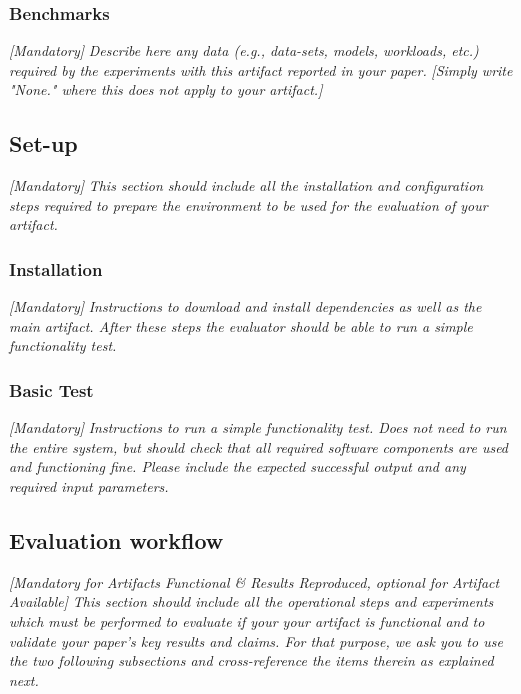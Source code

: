 \subsubsection{Benchmarks}
{\em [Mandatory]} \textit{Describe here any data (e.g., data-sets, models,
workloads, etc.) required by the experiments with this artifact reported in your
paper.} \textit{[Simply write "None." where this does not apply to your
artifact.]}

\subsection{Set-up}

{\em [Mandatory]} \textit{This section should include all the installation and
configuration steps required to prepare the environment to be used for the
evaluation of your artifact.}

\subsubsection{Installation}
{\em [Mandatory]} \textit{Instructions to download and install dependencies as
well as the main artifact. After these steps the evaluator should be able to run
a simple functionality test.}

\subsubsection{Basic Test}
{\em [Mandatory]} \textit{Instructions to run a simple functionality test. Does
not need to run the entire system, but should check that all required software
components are used and functioning fine. Please include the expected successful
output and any required input parameters.}

\subsection{Evaluation workflow}
{\em [Mandatory for Artifacts Functional \& Results Reproduced, optional for
Artifact Available]} \textit{This section should include all the operational
steps and experiments which must be performed to evaluate if your your artifact is
functional and to validate your paper's key results and claims. For that
purpose, we ask you to use the two following subsections and cross-reference the
items therein as explained next.}

